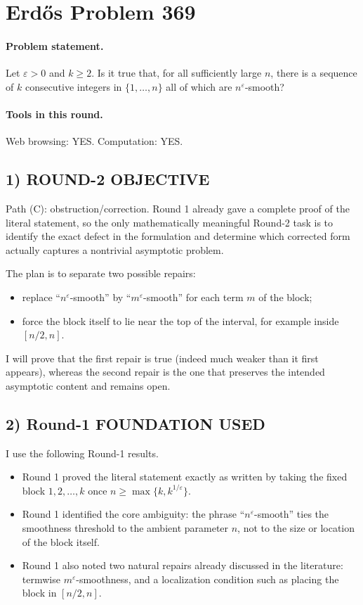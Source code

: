 \section{Erd\H{o}s Problem 369}

\paragraph{Problem statement.}
Let $\varepsilon>0$ and $k\geq 2$. Is it true that, for all sufficiently large $n$, there is a sequence of $k$ consecutive integers in $\{1,\ldots,n\}$ all of which are $n^{\varepsilon}$-smooth?

\paragraph{Tools in this round.}
Web browsing: YES. Computation: YES.

\subsection*{1) ROUND-2 OBJECTIVE}
Path (C): obstruction/correction. Round 1 already gave a complete proof of the literal statement, so the only mathematically meaningful Round-2 task is to identify the exact defect in the formulation and determine which corrected form actually captures a nontrivial asymptotic problem.

The plan is to separate two possible repairs:
\begin{itemize}
\item replace ``$n^{\varepsilon}$-smooth'' by ``$m^{\varepsilon}$-smooth'' for each term $m$ of the block;
\item force the block itself to lie near the top of the interval, for example inside $[n/2,n]$.
\end{itemize}
I will prove that the first repair is true (indeed much weaker than it first appears), whereas the second repair is the one that preserves the intended asymptotic content and remains open.

\subsection*{2) Round-1 FOUNDATION USED}
I use the following Round-1 results.
\begin{itemize}
\item Round 1 proved the literal statement exactly as written by taking the fixed block $1,2,\ldots,k$ once $n\geq \max\{k,k^{1/\varepsilon}\}$.
\item Round 1 identified the core ambiguity: the phrase ``$n^{\varepsilon}$-smooth'' ties the smoothness threshold to the ambient parameter $n$, not to the size or location of the block itself.
\item Round 1 also noted two natural repairs already discussed in the literature: termwise $m^{\varepsilon}$-smoothness, and a localization condition such as placing the block in $[n/2,n]$.
\end{itemize}

